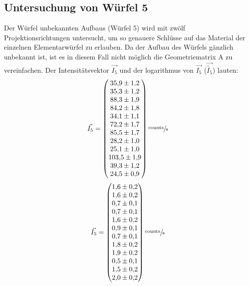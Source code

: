 \subsection{Untersuchung von Würfel 5}
Der Würfel unbekannten Aufbaus (Würfel 5) wird mit zwölf Projektionsrichtungen untersucht, um so genauere Schlüsse auf das Material der einzelnen Elementarwürfel zu erlauben. Da der Aufbau des Würfels
gänzlich unbekannt ist, ist es in diesem Fall nicht möglich die Geometriematrix A zu vereinfachen. Der Intensitätsvektor $\vec{I_5}$ und der logarithmus von $\vec{I_5}$ ($\vec{\tilde{I_5}}$) lauten:
\begin{equation}
	\vec{I_5}=
	\begin{pmatrix}
		\num{35.9 \pm 1.2} \\
		\num{35.3 \pm 1.2} \\
		\num{88.3\pm 1.9} \\
		\num{84.2\pm 1.8} \\
		\num{34.1\pm 1.1} \\
		\num{72.2\pm 1.7} \\
		\num{85.5\pm 1.7} \\
		\num{28.2\pm 1.0} \\
		\num{25.1\pm 1.0} \\
    \num{103.5\pm 1.9} \\
    \num{39.3\pm 1.2} \\
    \num{24.5\pm 0.9} \\
	\end{pmatrix}
    \sfrac{\text{counts}}{\text{s}}
	\label{eq:vec5}
\end{equation}
\begin{equation}
	\vec{I_5}=
	\begin{pmatrix}
		\num{1.6 \pm 0.2} \\
		\num{1.6 \pm 0.2} \\
		\num{0.7\pm 0.1} \\
		\num{0.7\pm 0.1} \\
		\num{1.6\pm 0.2} \\
		\num{0.9\pm 0.1} \\
		\num{0.7\pm 0.1} \\
		\num{1.8\pm 0.2} \\
		\num{1.9\pm 0.2} \\
    \num{0.5\pm 0.1} \\
    \num{1.5\pm 0.2} \\
    \num{2.0\pm 0.2} \\
	\end{pmatrix}
    \sfrac{\text{counts}}{\text{s}}
	\label{eq:vecleer1}
\end{equation}
